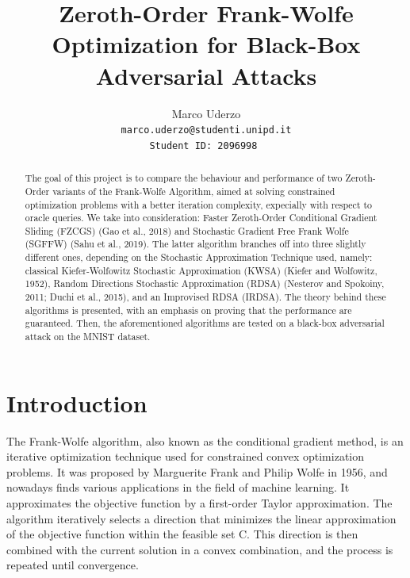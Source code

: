 \documentclass[10pt,twocolumn,letterpaper]{article}
\begin{document}
\title{Zeroth-Order Frank-Wolfe Optimization for Black-Box Adversarial Attacks}

\author{Marco Uderzo  \\
{\tt\small marco.uderzo@studenti.unipd.it}\\ 
\tt \small Student ID: 2096998
}

\maketitle

\begin{abstract}
   The goal of this project is to compare the behaviour and performance
   of two Zeroth-Order variants of the Frank-Wolfe Algorithm, aimed at 
   solving constrained optimization problems with a better iteration complexity,
   expecially with respect to oracle queries.
   We take into consideration: Faster Zeroth-Order Conditional Gradient Sliding (FZCGS)
   (Gao et al., 2018) and Stochastic Gradient Free Frank Wolfe 
   (SGFFW) (Sahu et al., 2019). The latter algorithm branches off into three slightly different ones,
   depending on the Stochastic Approximation Technique used, namely: classical Kiefer-Wolfowitz
   Stochastic Approximation (KWSA) (Kiefer and Wolfowitz, 1952), Random Directions Stochastic Approximation
   (RDSA) (Nesterov and Spokoiny, 2011; Duchi et al., 2015), and an Improvised RDSA (IRDSA). 
   The theory behind these algorithms is presented, with an emphasis on proving that the performance are guaranteed. 
   Then, the aforementioned algorithms are tested on a black-box adversarial attack on the MNIST dataset. 

\end{abstract}

\section{Introduction}

The Frank-Wolfe algorithm, also known as the conditional gradient method, 
is an iterative optimization technique used for constrained convex optimization problems. 
It was proposed by Marguerite Frank and Philip Wolfe in 1956, and nowadays finds various applications
in the field of machine learning. It approximates the objective function by a first-order Taylor approximation.
The algorithm iteratively selects a direction that minimizes the linear approximation of the objective function
within the feasible set C. This direction is then combined with the current solution in a convex combination, and the
process is repeated until convergence.
\end{document}
